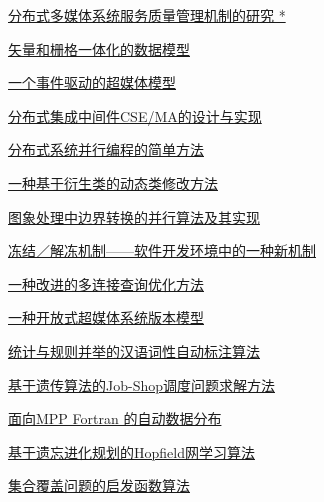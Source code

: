 \documentclass[a4paper]{article}
\begin{document}
\href{http://www.jos.org.cn/ch/reader/download_pdf.aspx?file_no=19980202&year_id=1998&quarter_id=2&falg=1}{分布式多媒体系统服务质量管理机制的研究 *}

\href{http://www.jos.org.cn/ch/reader/download_pdf.aspx?file_no=19980203&year_id=1998&quarter_id=2&falg=1}{矢量和栅格一体化的数据模型}

\href{http://www.jos.org.cn/ch/reader/download_pdf.aspx?file_no=19980204&year_id=1998&quarter_id=2&falg=1}{一个事件驱动的超媒体模型}

\href{http://www.jos.org.cn/ch/reader/download_pdf.aspx?file_no=19980205&year_id=1998&quarter_id=2&falg=1}{分布式集成中间件CSE/MA的设计与实现}

\href{http://www.jos.org.cn/ch/reader/download_pdf.aspx?file_no=19980206&year_id=1998&quarter_id=2&falg=1}{分布式系统并行编程的简单方法}

\href{http://www.jos.org.cn/ch/reader/download_pdf.aspx?file_no=19980207&year_id=1998&quarter_id=2&falg=1}{一种基于衍生类的动态类修改方法}

\href{http://www.jos.org.cn/ch/reader/download_pdf.aspx?file_no=19980208&year_id=1998&quarter_id=2&falg=1}{图象处理中边界转换的并行算法及其实现}

\href{http://www.jos.org.cn/ch/reader/download_pdf.aspx?file_no=19980209&year_id=1998&quarter_id=2&falg=1}{冻结／解冻机制——软件开发环境中的一种新机制}

\href{http://www.jos.org.cn/ch/reader/download_pdf.aspx?file_no=19980210&year_id=1998&quarter_id=2&falg=1}{一种改进的多连接查询优化方法}

\href{http://www.jos.org.cn/ch/reader/download_pdf.aspx?file_no=19980211&year_id=1998&quarter_id=2&falg=1}{一种开放式超媒体系统版本模型}

\href{http://www.jos.org.cn/ch/reader/download_pdf.aspx?file_no=19980212&year_id=1998&quarter_id=2&falg=1}{统计与规则并举的汉语词性自动标注算法}

\href{http://www.jos.org.cn/ch/reader/download_pdf.aspx?file_no=19980213&year_id=1998&quarter_id=2&falg=1}{基于遗传算法的Job-Shop调度问题求解方法}

\href{http://www.jos.org.cn/ch/reader/download_pdf.aspx?file_no=19980214&year_id=1998&quarter_id=2&falg=1}{面向MPP Fortran 的自动数据分布}

\href{http://www.jos.org.cn/ch/reader/download_pdf.aspx?file_no=19980215&year_id=1998&quarter_id=2&falg=1}{基于遗忘进化规划的Hopfield网学习算法}

\href{http://www.jos.org.cn/ch/reader/download_pdf.aspx?file_no=19980216&year_id=1998&quarter_id=2&falg=1}{集合覆盖问题的启发函数算法}
\end{document}
